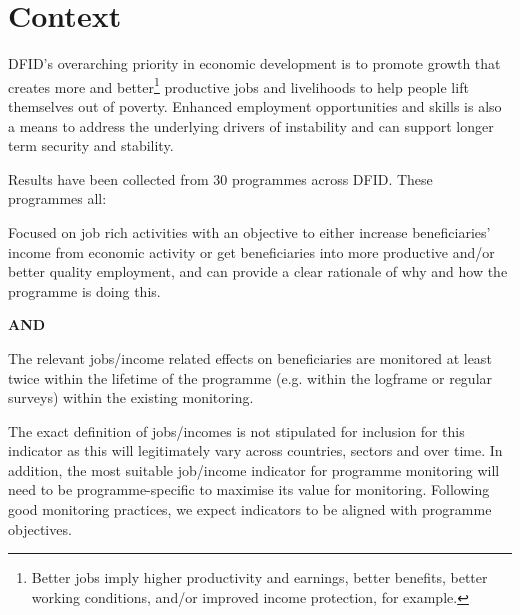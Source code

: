 \section{Context}

DFID's overarching priority in economic development is to promote growth that creates more and better\footnote{Better jobs imply higher productivity and earnings, better benefits, better working conditions, and/or improved income protection, for example.} productive jobs and livelihoods to help people lift themselves out of poverty. %
Enhanced employment opportunities and skills is also a means to address the underlying drivers of instability and can support longer term security and stability. %

Results have been collected from 30 programmes across DFID. %
These programmes all:
\begin{adjustwidth}{0.5cm}{}
Focused on job rich activities with an objective to either increase beneficiaries' income from economic activity or get beneficiaries into more productive and/or better quality employment, and can provide a clear rationale of why and how the programme is doing this.
\end{adjustwidth}

\begin{adjustwidth}{8cm}{}
\textbf{AND}
\end{adjustwidth}

\begin{adjustwidth}{0.5cm}{}
The relevant jobs/income related effects on beneficiaries are monitored at least twice within the lifetime of the programme (e.g. within the logframe or regular surveys) within the existing monitoring.
\end{adjustwidth}

The exact definition of jobs/incomes is not stipulated for inclusion for this indicator as this will legitimately vary across countries, sectors and over time. %
In addition, the most suitable job/income indicator for programme monitoring will need to be programme-specific to maximise its value for monitoring. %
Following good monitoring practices, we expect indicators to be aligned with programme objectives. %

\newpage
